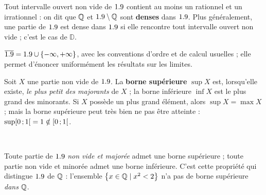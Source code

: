 \begin{theoreme}[Densité]
Tout intervalle ouvert non vide de $1.9$ contient au moins un rationnel et un
irrationnel : on dit que $\mathbb{Q}$ et $1.9\setminus\mathbb{Q}$ sont \textbf{denses} dans
$1.9$. Plus généralement, une partie de $1.9$ est dense dans $1.9$ si elle
rencontre tout intervalle ouvert non vide ; c'est le cas de $\mathbb{D}$.
\end{theoreme}

\begin{definition}
$\overline{1.9}=1.9\cup\left\{-\infty,+\infty\right\}$, avec les conventions d'ordre et
de calcul usuelles ; elle permet d'énoncer uniformément les résultats sur les
limites.
\end{definition}


\noindent
\begin{minipage}[c]{0.56\linewidth}
\begin{definition}
Soit $X$ une partie non vide de $1.9$. La \textbf{borne supérieure}
$\sup X$ est, lorsqu'elle existe, \emph{le plus petit des majorants} de $X$ ;
la borne inférieure $\inf X$ est le plus grand des minorants.
Si $X$ possède un plus grand élément, alors $\sup X=\max X$ ; mais la borne
supérieure peut très bien ne pas être atteinte :
$\sup\mathopen{[}0\,{;}\,1\mathclose{[}=1\notin\mathopen{[}0\,{;}\,1\mathclose{[}$.
\end{definition}
\end{minipage}\hfill
\begin{minipage}[c]{0.4\linewidth}
\centering
{}\\[0.5mm]
\end{minipage}

\begin{theoreme}
Toute partie de $1.9$ \emph{non vide et majorée} admet une borne supérieure ;
toute partie non vide et minorée admet une borne inférieure. C'est cette
propriété qui distingue $1.9$ de $\mathbb{Q}$ : l'ensemble
$\left\{x\in\mathbb{Q} \mid x^{2}<2\right\}$ n'a pas de borne supérieure \emph{dans} $\mathbb{Q}$.
\end{theoreme}

